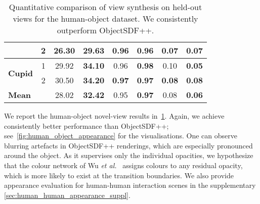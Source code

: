 \begin{table}[t]
{\begin{tabular}{|l|l|ll|ll|ll|}
\multicolumn{1}{|l|}{}                                         & \multicolumn{1}{c|}{2} & \multicolumn{1}{c|}{26.30} & \multicolumn{1}{c|}{\textbf{29.63}} & \multicolumn{1}{c|}{\textbf{0.96}} & \multicolumn{1}{c|}{\textbf{0.96}} & \multicolumn{1}{c|}{\textbf{0.07}} & \multicolumn{1}{c|}{\textbf{0.07}} \\ \hline
\multicolumn{1}{|l|}{\multirow{2}{*}{\textbf{Cupid}}}          & \multicolumn{1}{c|}{1} & \multicolumn{1}{c|}{29.92} & \multicolumn{1}{c|}{\textbf{34.10}} & \multicolumn{1}{c|}{0.96}          & \multicolumn{1}{c|}{\textbf{0.98}} & \multicolumn{1}{c|}{0.10}          & \multicolumn{1}{c|}{\textbf{0.05}} \\ \cline{2-8} 
\multicolumn{1}{|l|}{}                                         & \multicolumn{1}{c|}{2} & \multicolumn{1}{c|}{30.50} & \multicolumn{1}{c|}{\textbf{34.20}} & \multicolumn{1}{c|}{\textbf{0.97}} & \multicolumn{1}{c|}{\textbf{0.97}} & \multicolumn{1}{c|}{\textbf{0.08}} & \multicolumn{1}{c|}{\textbf{0.08}}          \\ \hline\hline
\multicolumn{1}{|l|}{\textbf{Mean}}                            & \multicolumn{1}{c|}{}  & \multicolumn{1}{c|}{28.02} & \multicolumn{1}{c|}{\textbf{32.42}} & \multicolumn{1}{c|}{0.95}          & \multicolumn{1}{c|}{\textbf{0.97}} & \multicolumn{1}{c|}{0.08}          & \multicolumn{1}{c|}{\textbf{0.06}} \\ \hline
\end{tabular}
}
\vspace{-1em}
\caption{Quantitative comparison of view synthesis on held-out views for the human-object dataset. 
We consistently outperform ObjectSDF++. 
}
\label{table:human_object_appearance}
\vspace{-1em}
\end{table}
We report the human-object novel-view results in~\cref{table:human_object_appearance}.
Again, we achieve consistently better performance than ObjectSDF++; see~\cref{fig:human_object_appearance} for the visualisations. 
One can observe blurring artefacts in ObjectSDF++ renderings, which are especially pronounced around the object.
As it supervises only the individual opacities, we hypothesize that the colour network of Wu \textit{et al.}~\cite{Wu2023objectsdfplus} assigns colours to any residual opacity, which is more likely to exist at the transition boundaries.
We also provide appearance evaluation for human-human interaction scenes in the supplementary \cref{sec:human_human_appearance_suppl}. 


